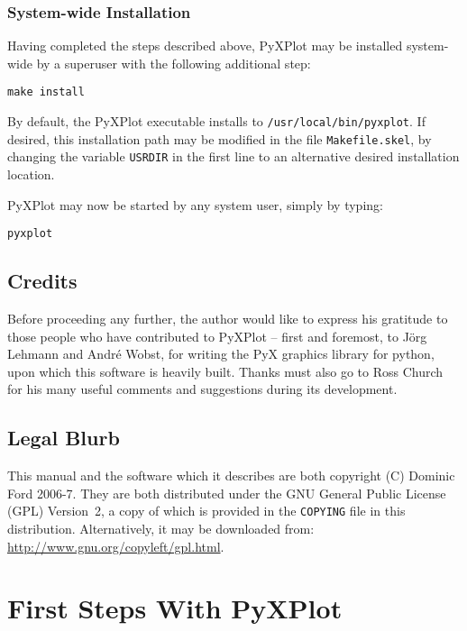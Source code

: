 \documentclass[a4paper,onecolumn,11pt]{book}
\begin{document}
\subsection{System-wide Installation}

Having completed the steps described above, PyXPlot may be installed
system-wide by a superuser with the following additional step:

\begin{verbatim}
make install
\end{verbatim}

By default, the PyXPlot executable installs to \texttt{/usr/local/bin/pyxplot}.
If desired, this installation path may be modified in the file
\texttt{Makefile.skel}, by changing the variable \texttt{USRDIR} in the first
line to an alternative desired installation location.

PyXPlot may now be started by any system user, simply by typing:

\begin{verbatim}
pyxplot
\end{verbatim}

\section{Credits}

Before proceeding any further, the author would like to express his gratitude
to those people who have contributed to PyXPlot -- first and foremost, to
J\"org Lehmann and Andr\'e Wobst, for writing the PyX graphics library for
python, upon which this software is heavily built. Thanks must also go to Ross
Church for his many useful comments and suggestions during its development.

\section{Legal Blurb}

This manual and the software which it describes are both copyright (C)
Dominic Ford 2006-7. They are both distributed under the GNU General Public
License (GPL) Version~2, a copy of which is provided in the \texttt{COPYING}
file in this distribution. Alternatively, it may
be downloaded from:\\ \url{http://www.gnu.org/copyleft/gpl.html}.

\chapter{First Steps With PyXPlot}
\label{gnuplot_intro}
\end{document}

